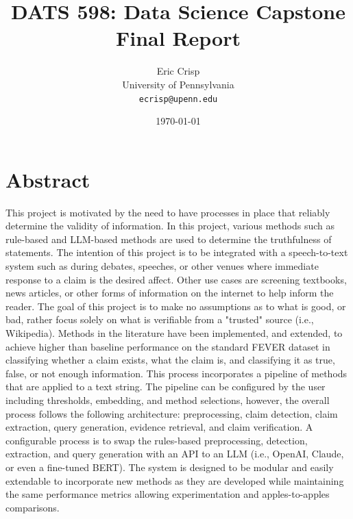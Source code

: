 \documentclass[11pt,letterpaper]{article}
\title{\Large \textbf{DATS 598: Data Science Capstone} \\ 
       \large Final Report \\
       \vspace{0.5cm}
       \normalsize \textbf{\workingtitle}}
\author{Eric Crisp \\ 
        University of Pennsylvania \\
        \texttt{ecrisp@upenn.edu}}
\date{\today}
\newcommand{\createAbstract}[1]{
    \section*{Abstract}
    \addcontentsline{toc}{section}{Abstract}
    #1
}
\begin{document}
\maketitle
\tableofcontents
\newpage


\createAbstract{

    This project is motivated by the need to have processes in place that reliably determine the validity of information. In this project, various methods such as rule-based and LLM-based methods are used to determine the truthfulness of statements. The intention of this project is to be integrated with a speech-to-text system such as during debates, speeches, or other venues where immediate response to a claim is the desired affect. Other use cases are screening textbooks, news articles, or other forms of information on the internet to help inform the reader. The goal of this project is to make no assumptions as to what is good, or bad, rather focus solely on what is verifiable from a "trusted" source (i.e., Wikipedia). Methods in the literature have been implemented, and extended, to achieve higher than baseline performance on the standard FEVER dataset in classifying whether a claim exists, what the claim is, and classifying it as true, false, or not enough information. This process incorporates a pipeline of methods that are applied to a text string. The pipeline can be configured by the user including thresholds, embedding, and method selections, however, the overall process follows the following architecture: preprocessing, claim detection, claim extraction, query generation, evidence retrieval, and claim verification. A configurable process is to swap the rules-based preprocessing, detection, extraction, and query generation with an API to an LLM (i.e., OpenAI, Claude, or even a fine-tuned BERT). The system is designed to be modular and easily extendable to incorporate new methods as they are developed while maintaining the same performance metrics allowing experimentation and apples-to-apples comparisons.

}
\end{document}
